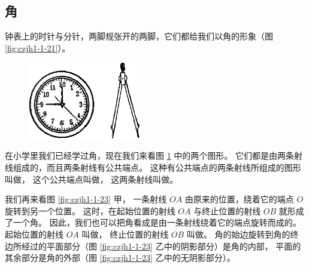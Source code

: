 \subsection{角}\label{subsec:czjh1-1-5}

钟表上的时针与分针，两脚规张开的两脚，它们都给我们以角的形象（图\ref{fig:czjh1-1-21}）。

\begin{figure}[htbp]
    \centering
    \begin{minipage}[b]{7cm}
        \centering
        \includegraphics[width=5cm]{../pic/czjh1-ch1-21.png}
        \caption{}\label{fig:czjh1-1-21}
    \end{minipage}
    \qquad
    \begin{minipage}[b]{7cm}
        \centering
        
        \caption{}\label{fig:czjh1-1-22}
    \end{minipage}
\end{figure}

在小学里我们已经学过角，现在我们来看图 \ref{fig:czjh1-1-22} 中的两个图形。
它们都是由两条射线组成的，而且两条射线有公共端点。
这种有公共端点的两条射线所组成的图形叫做，
这个公共端点叫做，
这两条射线叫做。

我们再来看图 \ref{fig:czjh1-1-23} 甲， 一条射线 $OA$ 由原来的位置，绕着它的端点 $O$ 旋转到另一个位置。
这时，在起始位置的射线 $OA$ 与终止位置的射线 $OB$ 就形成了一个角。
因此，我们也可以把角看成是由一条射线绕着它的端点旋转而成的。
起始位置的射线 $OA$ 叫做，
终止位置的射线 $OB$ 叫做。
角的始边旋转到角的终边所经过的平面部分（图 \ref{fig:czjh1-1-23} 乙中的阴影部分）是角的内部，
平面的其余部分是角的外部（图 \ref{fig:czjh1-1-23} 乙中的无阴影部分）。

